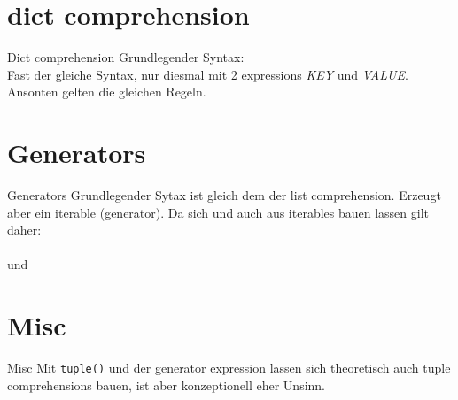 \section{dict comprehension}
\begin{frame}{Dict comprehension}
  Grundlegender Syntax: \\
  Fast der gleiche Syntax, nur diesmal mit 2 expressions \textit{KEY} und \textit{VALUE}. Ansonten gelten die gleichen Regeln.
\end{frame}


\section{Generators}
\begin{frame}{Generators}
  Grundlegender Sytax ist gleich dem der list comprehension. Erzeugt aber ein iterable (generator).
	Da sich  und  auch aus iterables bauen lassen gilt daher:\\

		\\
		und\\

\end{frame}


\section{Misc}
\begin{frame}{Misc}
  Mit \texttt{tuple()} und der generator expression lassen sich theoretisch auch tuple comprehensions bauen, ist aber konzeptionell eher Unsinn.
\end{frame}



